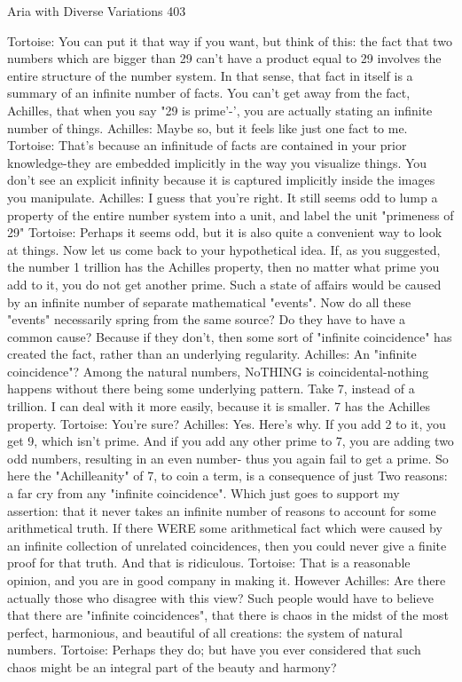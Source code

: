 Aria with Diverse Variations                                                              403

Tortoise: You can put it that way if you want, but think of this: the fact that two numbers
    which are bigger than 29 can't have a product equal to 29 involves the entire
    structure of the number system. In that sense, that fact in itself is a summary of an
    infinite number of facts. You can't get away from the fact, Achilles, that when you
    say "29 is prime'-', you are actually stating an infinite number of things.
Achilles: Maybe so, but it feels like just one fact to me.
Tortoise: That's because an infinitude of facts are contained in your prior knowledge-they
    are embedded implicitly in the way you visualize things. You don't see an explicit
    infinity because it is captured implicitly inside the images you manipulate.
Achilles: I guess that you're right. It still seems odd to lump a property of the entire
    number system into a unit, and label the unit "primeness of 29"
Tortoise: Perhaps it seems odd, but it is also quite a convenient way to look at things.
    Now let us come back to your hypothetical idea. If, as you suggested, the number 1
    trillion has the Achilles property, then no matter what prime you add to it, you do not
    get another prime. Such a state of affairs would be caused by an infinite number of
    separate mathematical "events". Now do all these "events" necessarily spring from
    the same source? Do they have to have a common cause? Because if they don't, then
    some sort of "infinite coincidence" has created the fact, rather than an underlying
    regularity.
Achilles: An "infinite coincidence"? Among the natural numbers, NoTHING is
    coincidental-nothing happens without there being some underlying pattern. Take 7,
    instead of a trillion. I can deal with it more easily, because it is smaller. 7 has the
    Achilles property.
Tortoise: You're sure?
Achilles: Yes. Here's why. If you add 2 to it, you get 9, which isn't prime. And if you add
    any other prime to 7, you are adding two odd numbers, resulting in an even number-
    thus you again fail to get a prime. So here the "Achilleanity" of 7, to coin a term, is a
    consequence of just Two reasons: a far cry from any "infinite coincidence". Which
    just goes to support my assertion: that it never takes an infinite number of reasons to
    account for some arithmetical truth. If there WERE some arithmetical fact which
    were caused by an infinite collection of unrelated coincidences, then you could never
    give a finite proof for that truth. And that is ridiculous.
Tortoise: That is a reasonable opinion, and you are in good company in making it.
    However
Achilles: Are there actually those who disagree with this view? Such people would have
    to believe that there are "infinite coincidences", that there is chaos in the midst of the
    most perfect, harmonious, and beautiful of all creations: the system of natural
    numbers.
Tortoise: Perhaps they do; but have you ever considered that such chaos might be an
    integral part of the beauty and harmony?




